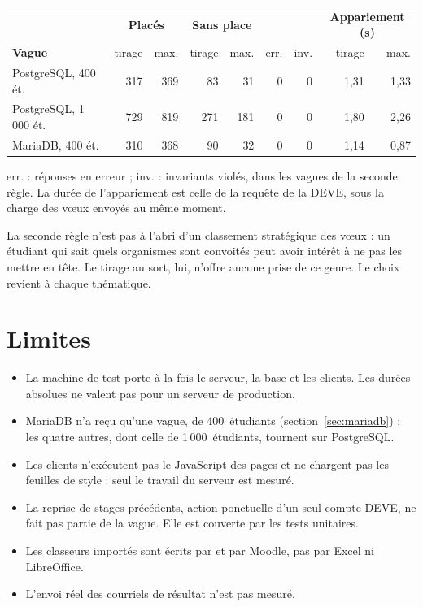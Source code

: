 \documentclass[11pt,a4paper]{article}
\newcommand{\code}[1]{\texttt{\detokenize{#1}}}
\begin{document}
\begin{center}
\small
\begin{tabularx}{\linewidth}{@{}X r r r r r r r r@{}}
\toprule
& \multicolumn{2}{c}{\textbf{Placés}} & \multicolumn{2}{c}{\textbf{Sans place}} & & & \multicolumn{2}{c}{\textbf{Appariement (s)}} \\
\textbf{Vague} & tirage & max. & tirage & max. & err. & inv. & tirage & max. \\
\midrule
PostgreSQL, 400 ét. & 317 & 369 & 83 & 31 & 0 & 0 & 1{,}31 & 1{,}33 \\
PostgreSQL, 1\,000 ét. & 729 & 819 & 271 & 181 & 0 & 0 & 1{,}80 & 2{,}26 \\
MariaDB, 400 ét. & 310 & 368 & 90 & 32 & 0 & 0 & 1{,}14 & 0{,}87 \\
\bottomrule
\end{tabularx}
\end{center}

\noindent \og err.\fg{} : réponses en erreur ; \og inv.\fg{} : invariants violés, dans les vagues de
la seconde règle. La durée de l'appariement est celle de la requête de la DEVE, sous la charge des
vœux envoyés au même moment.

La seconde règle n'est pas à l'abri d'un classement stratégique des vœux : un étudiant qui sait
quels organismes sont convoités peut avoir intérêt à ne pas les mettre en tête. Le tirage au sort,
lui, n'offre aucune prise de ce genre. Le choix revient à chaque thématique.

\section{Limites}

\begin{itemize}
  \item La machine de test porte à la fois le serveur, la base et les clients. Les durées
    absolues ne valent pas pour un serveur de production.
  \item MariaDB n'a reçu qu'une vague, de 400~étudiants (section~\ref{sec:mariadb}) ; les quatre
    autres, dont celle de 1\,000~étudiants, tournent sur PostgreSQL.
  \item Les clients n'exécutent pas le JavaScript des pages et ne chargent pas les feuilles de
    style : seul le travail du serveur est mesuré.
  \item La reprise de stages précédents, action ponctuelle d'un seul compte DEVE, ne fait pas
    partie de la vague. Elle est couverte par les tests unitaires.
  \item Les classeurs importés sont écrits par \code{openpyxl} et par Moodle, pas par Excel ni
    LibreOffice.
  \item L'envoi réel des courriels de résultat n'est pas mesuré.
\end{itemize}
\end{document}
